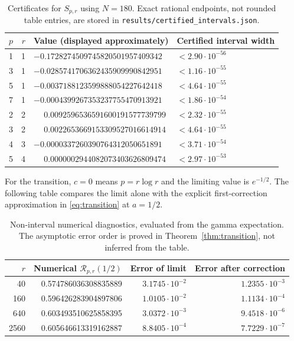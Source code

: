 \documentclass[11pt]{article}
\numberwithin{equation}{section}
\theoremstyle{definition}\newtheorem{definition}[theorem]{Definition}
\theoremstyle{remark}\newtheorem{remark}[theorem]{Remark}
\newcommand{\src}[1]{\nolinkurl{#1}}
\begin{document}
\begin{table}[ht]
\centering\small
\begin{tabular}{rrll}
\toprule
$p$&$r$&Value (displayed approximately)&Certified interval width\\
\midrule
1&1&$-0.1728274509745820501957409342$&$<2.90\cdot10^{-56}$\\
3&1&$-0.0285741706362435909990842951$&$<1.16\cdot10^{-55}$\\
5&1&$-0.0037188123599888054227642418$&$<4.64\cdot10^{-55}$\\
7&1&$-0.0004399267353237755470913921$&$<1.86\cdot10^{-54}$\\
2&2&$\phantom{-}0.0092596536591600191577739799$&$<2.32\cdot10^{-55}$\\
3&2&$\phantom{-}0.0022653669153309527016614914$&$<4.64\cdot10^{-55}$\\
4&3&$-0.0000337260390764312050651891$&$<3.71\cdot10^{-54}$\\
5&4&$\phantom{-}0.0000002944082073403626809474$&$<2.97\cdot10^{-53}$\\
\bottomrule
\end{tabular}
\caption{Certificates for $S_{p,r}$ using $N=180$. Exact rational endpoints, not rounded table entries, are stored in \src{results/certified_intervals.json}.}
\end{table}

For the transition, $c=0$ means $p=r\log r$ and the limiting value is $e^{-1/2}$. The following table compares the limit alone with the explicit first-correction approximation in \eqref{eq:transition} at $a=1/2$.
\begin{table}[ht]
\centering\small
\begin{tabular}{rrrr}
\toprule
$r$&Numerical $\mathcal R_{p,r}(1/2)$&Error of limit&Error after correction\\
\midrule
40&0.574786036308835889&$3.1745\cdot10^{-2}$&$1.2355\cdot10^{-3}$\\
160&0.596426283904897806&$1.0105\cdot10^{-2}$&$1.1134\cdot10^{-4}$\\
640&0.603493510625858395&$3.0372\cdot10^{-3}$&$9.4518\cdot10^{-6}$\\
2560&0.605646613319162887&$8.8405\cdot10^{-4}$&$7.7229\cdot10^{-7}$\\
\bottomrule
\end{tabular}
\caption{Non-interval numerical diagnostics, evaluated from the gamma expectation. The asymptotic error order is proved in Theorem~\ref{thm:transition}, not inferred from the table.}
\end{table}
\end{document}
